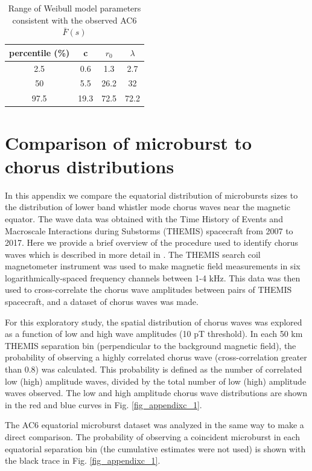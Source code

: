 \documentclass[draft]{agujournal2019}
\begin{document}
\begin{table}[h]
\caption{Range of Weibull model parameters consistent with the observed AC6  $\bar{F}(s)$}
\label{table_s2}
\centering
\begin{tabular}{|c|c|c|c|}
\hline 
percentile (\%) & c & $r_0$ & $\lambda$ \\ 
\hline 
2.5 & 0.6 & 1.3 & 2.7 \\ 
\hline 
50 & 5.5 & 26.2 & 32 \\ 
\hline 
97.5 & 19.3 & 72.5 & 72.2 \\ 
\hline 
\end{tabular} 
\end{table}

\section{Comparison of microburst to chorus distributions} \label{appendixc}
In this appendix we compare the equatorial distribution of microbursts sizes to the distribution of lower band whistler mode chorus waves near the magnetic equator. The wave data was obtained with the Time History of Events and Macroscale Interactions during Substorms (THEMIS) spacecraft from 2007 to 2017. Here we provide a brief overview of the procedure used to identify chorus waves which is described in more detail in . The THEMIS search coil magnetometer instrument was used to make magnetic field measurements in six logarithmically-spaced frequency channels between 1-4 kHz. This data was then used to cross-correlate the chorus wave amplitudes between pairs of THEMIS spacecraft, and a dataset of chorus waves was made.

For this exploratory study, the spatial distribution of chorus waves was explored as a function of low and high wave amplitudes (10 pT threshold). In each 50 km THEMIS separation bin (perpendicular to the background magnetic field), the probability of observing a highly correlated chorus wave (cross-correlation greater than 0.8) was calculated. This probability is defined as the number of correlated low (high) amplitude waves, divided by the total number of low (high) amplitude waves observed. The low and high amplitude chorus wave distributions are shown in the red and blue curves in  Fig. \ref{fig_appendixc_1}. 

The AC6 equatorial microburst dataset was analyzed in the same way to make a direct comparison. The probability of observing a coincident microburst in each equatorial separation bin (the cumulative estimates were not used) is shown with the black trace in Fig. \ref{fig_appendixc_1}.
\end{document}

